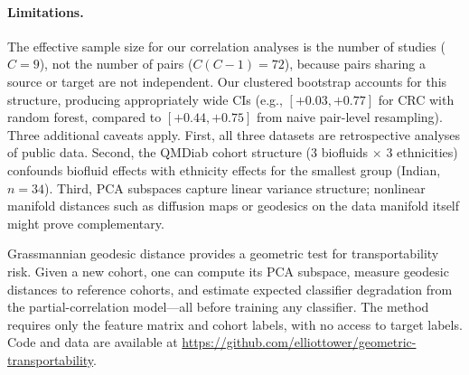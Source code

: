 \documentclass{article}
\begin{document}
\paragraph{Limitations.} The effective sample size for our correlation analyses is the number of studies ($C = 9$), not the number of pairs ($C(C-1) = 72$), because pairs sharing a source or target are not independent. Our clustered bootstrap accounts for this structure, producing appropriately wide CIs (e.g., $[+0.03, +0.77]$ for CRC with random forest, compared to $[+0.44, +0.75]$ from naive pair-level resampling). Three additional caveats apply. First, all three datasets are retrospective analyses of public data. Second, the QMDiab cohort structure (3 biofluids $\times$ 3 ethnicities) confounds biofluid effects with ethnicity effects for the smallest group (Indian, $n = 34$). Third, PCA subspaces capture linear variance structure; nonlinear manifold distances such as diffusion maps or geodesics on the data manifold itself \citep{conway1996functions} might prove complementary.

Grassmannian geodesic distance provides a geometric test for transportability risk. Given a new cohort, one can compute its PCA subspace, measure geodesic distances to reference cohorts, and estimate expected classifier degradation from the partial-correlation model---all before training any classifier. The method requires only the feature matrix and cohort labels, with no access to target labels. Code and data are available at \url{https://github.com/elliottower/geometric-transportability}.



\end{document}

